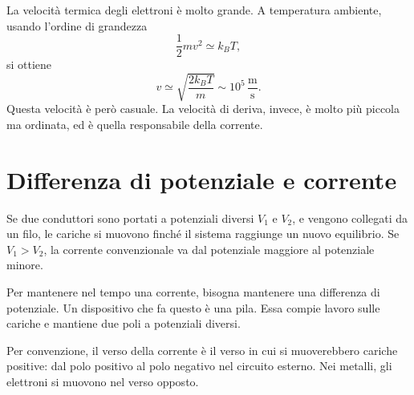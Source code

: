 \documentclass[a4paper]{article}
\begin{document}
La velocità termica degli elettroni è molto grande. A temperatura ambiente, usando l'ordine di grandezza
\[
    \frac{1}{2}m v^2\simeq k_BT,
\]
si ottiene
\[
    v\simeq \sqrt{\frac{2k_BT}{m}}\sim 10^5\,\frac{\mathrm{m}}{\mathrm{s}}.
\]
Questa velocità è però casuale. La velocità di deriva, invece, è molto più piccola ma ordinata, ed è quella responsabile della corrente.

\section{Differenza di potenziale e corrente}

Se due conduttori sono portati a potenziali diversi \(V_1\) e \(V_2\), e vengono collegati da un filo, le cariche si muovono finché il sistema raggiunge un nuovo equilibrio. Se \(V_1>V_2\), la corrente convenzionale va dal potenziale maggiore al potenziale minore.

\begin{center}
\end{center}

Per mantenere nel tempo una corrente, bisogna mantenere una differenza di potenziale. Un dispositivo che fa questo è una pila. Essa compie lavoro sulle cariche e mantiene due poli a potenziali diversi.

\begin{center}
\end{center}

Per convenzione, il verso della corrente è il verso in cui si muoverebbero cariche positive: dal polo positivo al polo negativo nel circuito esterno. Nei metalli, gli elettroni si muovono nel verso opposto.
\end{document}
